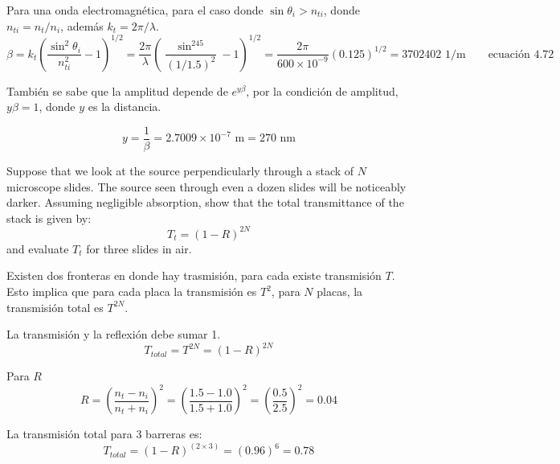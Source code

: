 \documentclass[addpoints,10pt]{exam}
\begin{document}
\begin{questions}
		Para una onda electromagn\'etica, para el caso donde $\sin\theta_i > n_{ti}$, donde $n_{ti} = n_{t}/n_{i}$, adem\'as $k_t = 2\pi/\lambda$.
		\begin{equation}
			\beta = k_t\left(\dfrac{\sin^2\theta_i}{n_{ti}^2} - 1\right)^{1/2} = \dfrac{2\pi}{\lambda}\left(\dfrac{\sin^245}{(1/1.5)^2} - 1\right)^{1/2} = \dfrac{2\pi}{600\times10^{-9}}(0.125)^{1/2}= 3702402 \text{ 1/m} \qquad \text{ecuaci\'on 4.72}
		\end{equation}
		
		Tambi\'en se sabe que la amplitud depende de $e^{y\beta}$, por la condici\'on de amplitud, $y\beta = 1$, donde $y$ es la distancia.
		
		\begin{equation}
			y = \dfrac{1}{\beta} = 2.7009\times 10^{-7}\text{ m} = 270 \text{ nm}
		\end{equation}
		
		{
			\question
			Suppose that we look at the source perpendicularly through a stack of $N$ microscope slides. The source seen through even a dozen slides will be noticeably darker. Assuming negligible absorption, show that the total transmittance of the stack is given by:
			\begin{equation*}
				T_t = (1-R)^{2N}
			\end{equation*}
			and evaluate $T_t$ for three slides in air.
		}
		
		Existen dos fronteras en donde hay trasmisi\'on, para cada existe transmisi\'on $T$. Esto implica que para cada placa la transmisi\'on es $T^2$, para $N$ placas, la transmisi\'on total es $T^{2N}$.
			
		La transmisi\'on y la reflexi\'on debe sumar 1.
		\begin{equation}
			T_{total} = T^{2N} = (1-R)^{2N}
		\end{equation}
		
		Para $R$
		\begin{equation}
			R = \left(\dfrac{n_t - n_i}{n_t  + n_i}\right)^2 = \left(\dfrac{1.5 - 1.0}{1.5 + 1.0}\right)^2 = \left(\dfrac{0.5}{2.5}\right)^2 = 0.04
		\end{equation}
		
		La transmisi\'on total para 3 barreras es:
		\begin{equation}
			T_{total} = (1 - R)^(2\times3) = (0.96)^6 = 0.78
		\end{equation}
	\end{questions}
	
	
\end{document}
